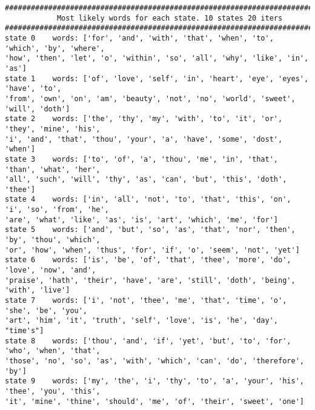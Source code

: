 \begin{lstlisting}[mathescape]
######################################################################################################
            Most likely words for each state. 10 states 20 iters
######################################################################################################
state 0    words: ['for', 'and', 'with', 'that', 'when', 'to', 'which', 'by', 'where',
'how', 'then', 'let', 'o', 'within', 'so', 'all', 'why', 'like', 'in', 'as']
state 1    words: ['of', 'love', 'self', 'in', 'heart', 'eye', 'eyes', 'have', 'to',
'from', 'own', 'on', 'am', 'beauty', 'not', 'no', 'world', 'sweet', 'will', 'doth']
state 2    words: ['the', 'thy', 'my', 'with', 'to', 'it', 'or', 'they', 'mine', 'his',
'i', 'and', 'that', 'thou', 'your', 'a', 'have', 'some', 'dost', 'when']
state 3    words: ['to', 'of', 'a', 'thou', 'me', 'in', 'that', 'than', 'what', 'her', 
'all', 'such', 'will', 'thy', 'as', 'can', 'but', 'this', 'doth', 'thee']
state 4    words: ['in', 'all', 'not', 'to', 'that', 'this', 'on', 'i', 'so', 'from', 'he', 
'are', 'what', 'like', 'as', 'is', 'art', 'which', 'me', 'for']
state 5    words: ['and', 'but', 'so', 'as', 'that', 'nor', 'then', 'by', 'thou', 'which', 
'or', 'how', 'when', 'thus', 'for', 'if', 'o', 'seem', 'not', 'yet']
state 6    words: ['is', 'be', 'of', 'that', 'thee', 'more', 'do', 'love', 'now', 'and', 
'praise', 'hath', 'their', 'have', 'are', 'still', 'doth', 'being', 'with', 'live']
state 7    words: ['i', 'not', 'thee', 'me', 'that', 'time', 'o', 'she', 'be', 'you',
'art', 'him', 'it', 'truth', 'self', 'love', 'is', 'he', 'day', "time's"]
state 8    words: ['thou', 'and', 'if', 'yet', 'but', 'to', 'for', 'who', 'when', 'that',
'those', 'no', 'so', 'as', 'with', 'which', 'can', 'do', 'therefore', 'by']
state 9    words: ['my', 'the', 'i', 'thy', 'to', 'a', 'your', 'his', 'thee', 'you', 'this',
'it', 'mine', 'thine', 'should', 'me', 'of', 'their', 'sweet', 'one']
\end{lstlisting}

